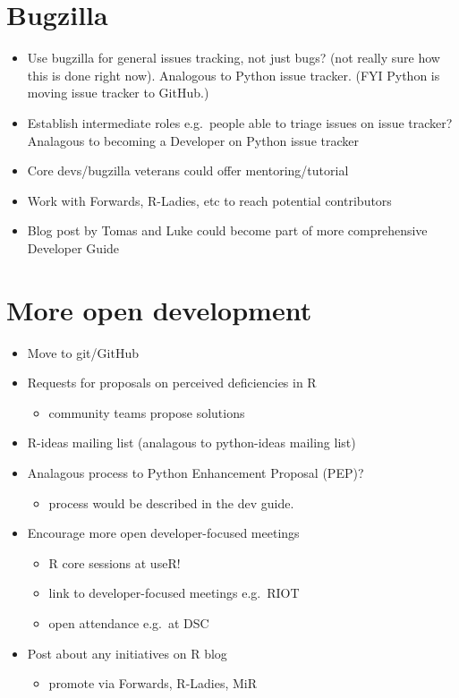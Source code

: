 \documentclass[]{book}
\providecommand{\tightlist}{%
  \setlength{\itemsep}{0pt}\setlength{\parskip}{0pt}}
\begin{document}
\hypertarget{bugzilla}{%
\chapter{Bugzilla}\label{bugzilla}}

\begin{itemize}
\item
  Use bugzilla for general issues tracking, not just bugs? (not really sure how this is done right now). Analogous to Python issue tracker. (FYI Python is moving issue tracker to GitHub.)
\item
  Establish intermediate roles e.g.~people able to triage issues on issue tracker? Analagous to becoming a Developer on Python issue tracker
\item
  Core devs/bugzilla veterans could offer mentoring/tutorial
\item
  Work with Forwards, R-Ladies, etc to reach potential contributors
\item
  Blog post by Tomas and Luke could become part of more comprehensive Developer Guide
\end{itemize}

\hypertarget{more-open-development}{%
\chapter{More open development}\label{more-open-development}}

\begin{itemize}
\item
  Move to git/GitHub
\item
  Requests for proposals on perceived deficiencies in R

  \begin{itemize}
  \tightlist
  \item
    community teams propose solutions
  \end{itemize}
\item
  R-ideas mailing list (analagous to python-ideas mailing list)
\item
  Analagous process to Python Enhancement Proposal (PEP)?

  \begin{itemize}
  \tightlist
  \item
    process would be described in the dev guide.
  \end{itemize}
\item
  Encourage more open developer-focused meetings

  \begin{itemize}
  \tightlist
  \item
    R core sessions at useR!
  \item
    link to developer-focused meetings e.g.~RIOT
  \item
    open attendance e.g.~at DSC
  \end{itemize}
\item
  Post about any initiatives on R blog

  \begin{itemize}
  \tightlist
  \item
    promote via Forwards, R-Ladies, MiR
  \end{itemize}
\end{itemize}
\end{document}
